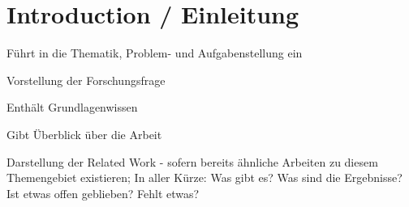 \chapter{Introduction / Einleitung}
\label{ch:introduction}

Führt in die Thematik, Problem- und Aufgabenstellung ein

Vorstellung der Forschungsfrage

Enthält Grundlagenwissen

Gibt Überblick über die Arbeit

Darstellung der Related Work - sofern bereits ähnliche Arbeiten zu diesem Themengebiet existieren; In aller Kürze: Was gibt es? Was sind die Ergebnisse? Ist etwas offen geblieben? Fehlt etwas?
